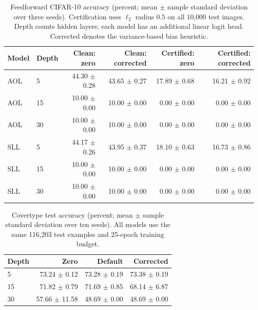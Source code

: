 \begin{table}[pos=htbp]
\centering
\small
\caption{Feedforward CIFAR-10 accuracy (percent; mean $\pm$ sample standard deviation over three seeds). Certification uses $\ell_2$ radius $0.5$ on all 10,000 test images. Depth counts hidden layers; each model has an additional linear logit head. Corrected denotes the variance-based bias heuristic.}
\begin{tabular}{llrrrr}
Model & Depth & Clean: zero & Clean: corrected & Certified: zero & Certified: corrected \\
\hline
AOL & 5 & 44.30 $\pm$ 0.28 & 43.65 $\pm$ 0.27 & 17.89 $\pm$ 0.68 & 16.21 $\pm$ 0.92 \\
AOL & 15 & 10.00 $\pm$ 0.00 & 10.00 $\pm$ 0.00 & 0.00 $\pm$ 0.00 & 0.00 $\pm$ 0.00 \\
AOL & 30 & 10.00 $\pm$ 0.00 & 10.00 $\pm$ 0.00 & 0.00 $\pm$ 0.00 & 0.00 $\pm$ 0.00 \\
SLL & 5 & 44.17 $\pm$ 0.26 & 43.95 $\pm$ 0.37 & 18.10 $\pm$ 0.63 & 16.73 $\pm$ 0.86 \\
SLL & 15 & 10.00 $\pm$ 0.00 & 10.00 $\pm$ 0.00 & 0.00 $\pm$ 0.00 & 0.00 $\pm$ 0.00 \\
SLL & 30 & 10.00 $\pm$ 0.00 & 10.00 $\pm$ 0.00 & 0.00 $\pm$ 0.00 & 0.00 $\pm$ 0.00 \\
\end{tabular}
\label{tab:feedforward-results}
\end{table}

\begin{table}[pos=htbp]
\centering
\small
\setlength{\tabcolsep}{3pt}
\caption{Covertype test accuracy (percent; mean $\pm$ sample standard deviation over ten seeds). All models use the same 116,203 test examples and 25-epoch training budget.}
\begin{tabular}{lrrr}
Depth & Zero & Default & Corrected \\
\hline
5 & 73.24 $\pm$ 0.12 & 73.28 $\pm$ 0.19 & 73.38 $\pm$ 0.19 \\
15 & 71.82 $\pm$ 0.79 & 71.69 $\pm$ 0.85 & 68.14 $\pm$ 6.87 \\
30 & 57.66 $\pm$ 11.58 & 48.69 $\pm$ 0.00 & 48.69 $\pm$ 0.00 \\
\end{tabular}
\label{tab:covertype-results}
\end{table}


